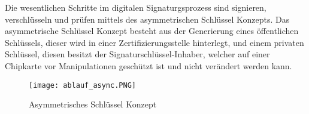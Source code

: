 Die wesentlichen Schritte im digitalen Signaturgsprozess sind signieren, verschlüsseln und prüfen mittels des asymmetrischen Schlüssel Konzepts. Das asymmetrische Schlüssel Konzept besteht aus der Generierung eines öffentlichen Schlüssels, dieser wird in einer Zertifizierungsstelle hinterlegt, und einem privaten Schlüssel, diesen besitzt der Signaturschlüssel-Inhaber, welcher auf einer Chipkarte vor Manipulationen geschützt ist und nicht verändert werden kann. \cite{techno1} 
\begin{figure}[!ht]
    \centering
    \texttt{[image: ablauf\_async.PNG]}
    \caption[Asymmetrisches Schlüssel Konzept]{\small{Asymmetrisches Schlüssel Konzept \cite{techno5}}}
\end{figure}